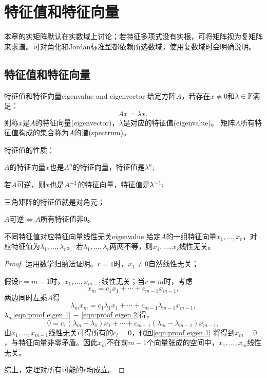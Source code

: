 
\chapter{特征值和特征向量}
本章的实矩阵默认在实数域上讨论；若特征多项式没有实根，可将矩阵视为复矩阵来求谱。可对角化和Jordan标准型都依赖所选数域，使用复数域时会明确说明。
\section{特征值和特征向量}
\begin{definition}{特征值和特征向量}{eigenvalue and eigenvector}
	给定方阵$A$，若存在$x \neq 0$和$\lambda \in \mathbb{F}$满足：
	\begin{equation}\label{eq:la-eigenpair}
		Ax = \lambda x,
	\end{equation}
	则称$x$是$A$的特征向量(eigenvector)，$\lambda$是对应的特征值(eigenvalue)。
	矩阵$A$所有特征值构成的集合称为$A$的谱(spectrum)。
\end{definition}

\begin{corollary}
	特征值的性质：
	\begin{compactenum}
		\item $A$的特征向量$x$也是$A^n$的特征向量，特征值是$\lambda^n;$
		\item 若$A$可逆，则$x$也是$A^{-1}$的特征向量，特征值是$\lambda^{-1};$
		\item 三角矩阵的特征值就是对角元；
		\item $A$可逆$\iff A$所有特征值非0。
		
	\end{compactenum}
\end{corollary}

\begin{theorem}{不同特征值对应特征向量线性无关}{eigenvalue}
	给定$A$的一组特征向量$x_1,\ldots,x_r$，对应特征值为$\lambda_1,\ldots,\lambda_r$。
	若$\lambda_1,\ldots,\lambda_r$两两不等，则$x_1,\ldots,x_r$线性无关。
\end{theorem}
\begin{proof}
	运用数学归纳法证明。$r = 1$时，$x_1 \neq 0$自然线性无关；
	
	假设$r = m - 1$时，$x_1,\ldots,x_{m-1}$线性无关；当$r = m$时，考虑
	\begin{equation}
		\label{eqn:proof eigen 1}
		x_m = c_1x_1 + \cdots + c_{m-1}x_{m-1},
	\end{equation}
	两边同时左乘$A$得
	\begin{equation}
		\label{eqn:proof eigen 2}
		\lambda_mx_m = c_1\lambda_1x_1 + \cdots + c_{m-1}\lambda_{m-1}x_{m-1},
	\end{equation}
	$\lambda_m$\eqref{eqn:proof eigen 1} $-$ \eqref{eqn:proof eigen 2}得，
	\[
		0 = c_1(\lambda_m - \lambda_1)x_1 + \cdots + c_{m-1}(\lambda_m - \lambda_{m-1})x_{m-1},
	\]
	由$x_1,\ldots,x_{m-1}$线性无关可得所有的$c_i = 0$，代回\eqref{eqn:proof eigen 1} 将得到$x_m = 0$，与特征向量非零矛盾。因此$x_m$不在前$m - 1$个向量张成的空间中，$x_1,\ldots,x_m$线性无关。

	综上，定理对所有可能的$r$均成立。
\end{proof}

